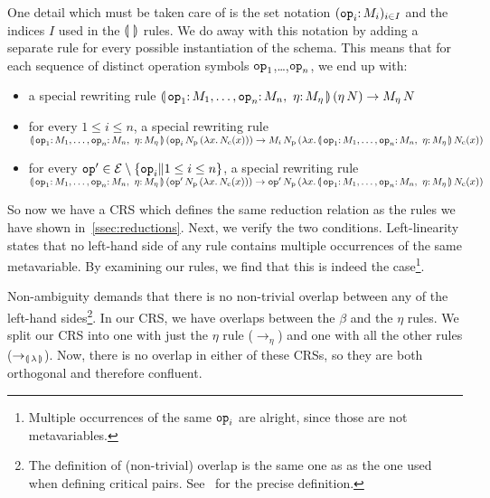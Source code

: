 \documentclass{llncs}
\begin{document}
One detail which must be taken care of is the set notation
$(\onto{\op{op}_i}{M_i})_{i \in I}$ and the indices $I$ used in the
$\llparenthesis \,  \, \rrparenthesis$ rules. We do away with this notation by adding a separate rule
for every possible instantiation of the schema. This means that for each
sequence of distinct operation symbols $\mathtt{op}_1$,\ldots,$\mathtt{op}_n$, we
end up with:
\begin{itemize}
\item a special rewriting rule
  $\ap{\banana{\onto{\op{op}_1}{M_1},\ldots,\onto{\op{op}_n}{M_n},\ 
    \onto{\eta}{M_\eta}}}{(\etaE{N})}
  \to \ap{M_\eta}{N}$
\item for every $1 \le i \le n$, a special rewriting rule \\
  $\ap{\banana{\onto{\op{op}_1}{M_1},\ldots,\onto{\op{op}_n}{M_n},\ 
    \onto{\eta}{M_\eta}}}{(\app{\op{op}_i}{N_{\mathrm{p}}}{(\lam{x}{N_{\mathrm{c}}(x)})})}
  \\ \to
  \app{M_i}{N_{\mathrm{p}}}{(\lam{x}{\ap{\banana{\onto{\op{op}_1}{M_1},\ldots,\onto{\op{op}_n}{M_n},\ \onto{\eta}{M_\eta}}}{N_{\mathrm{c}}(x)}})}$
\item for every $\mathtt{op}' \in \mathcal{E} \setminus \{\mathtt{op}_i \| 1 \le i \le n\}$, a special
  rewriting rule \\
  $\ap{\banana{\onto{\op{op}_1}{M_1},\ldots,\onto{\op{op}_n}{M_n},\ 
    \onto{\eta}{M_\eta}}}{(\app{\op{op}'}{N_{\mathrm{p}}}{(\lam{x}{N_{\mathrm{c}}(x)})})}
  \\ \to
  \app{\op{op}'}{N_{\mathrm{p}}}{(\lam{x}{\ap{\banana{\onto{\op{op}_1}{M_1},\ldots,\onto{\op{op}_n}{M_n},\ \onto{\eta}{M_\eta}}}{N_{\mathrm{c}}(x)}})}$
\end{itemize}

So now we have a CRS which defines the same reduction relation as the rules
we have shown in~\ref{ssec:reductions}. Next, we verify the two
conditions. Left-linearity states that no left-hand side of any rule
contains multiple occurrences of the same metavariable. By examining our
rules, we find that this is indeed the case\footnote{Multiple occurrences
  of the same $\mathtt{op}_i$ are alright, since those are not metavariables.}.

Non-ambiguity demands that there is no non-trivial overlap between any of
the left-hand sides\footnote{The definition of (non-trivial) overlap is the
  same one as as the one used when defining critical
  pairs. See~\cite{klop1993combinatory} for the precise definition.}. In
our CRS, we have overlaps between the $\beta$ and the $\eta$ rules. We
split our CRS into one with just the $\eta$ rule ($\to_\eta$) and one with
all the other rules ($\to_{\llparenthesis \, \lambda \, \rrparenthesis}$). Now, there is no overlap in
either of these CRSs, so they are both orthogonal and therefore confluent.
\end{document}
